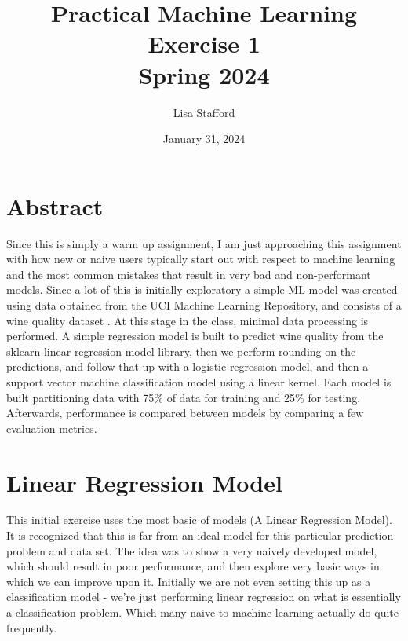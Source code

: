 \documentclass[titlepage]{article}
\title{%
	Practical Machine Learning\\
	
	\vspace*{2em}
	\LARGE Exercise 1 \\
	Spring 2024}
\author{Lisa Stafford}
\date{January 31, 2024}
\begin{document}
	
	\maketitle
	
	\captionsetup{
		format = plain,
		font = footnotesize,
		labelfont = sc
	}
	
	\section*{Abstract}
	Since this is simply a warm up assignment, I am just approaching this assignment with how new or naive users typically start out with respect to machine learning and the most common mistakes that result in very bad and non-performant models.  Since a lot of this is initially exploratory a simple ML model was created using data obtained from the UCI Machine Learning Repository, and consists of a wine quality dataset \cite{dataset1}.  At this stage in the class, minimal data processing is performed.  A simple regression model is built to predict wine quality from the sklearn linear regression model library, then we perform rounding on the predictions, and follow that up with a logistic regression model, and then a support vector machine classification model using a linear kernel.  Each model is built partitioning data with 75\% of data for training and 25\% for testing.  Afterwards, performance is compared between models by comparing a few evaluation metrics. 
	
	\section*{Linear Regression Model}
	This initial exercise uses the most basic of models (A Linear Regression Model). It is recognized that this is far from an ideal model for this particular prediction problem and data set. The idea was to show a very naively developed model, which should result in poor performance, and then explore very basic ways in which we can improve upon it.	Initially we are not even setting this up as a classification model - we're just performing linear regression on what is essentially a classification problem. Which many naive to machine learning actually do quite frequently.
	
\end{document}
